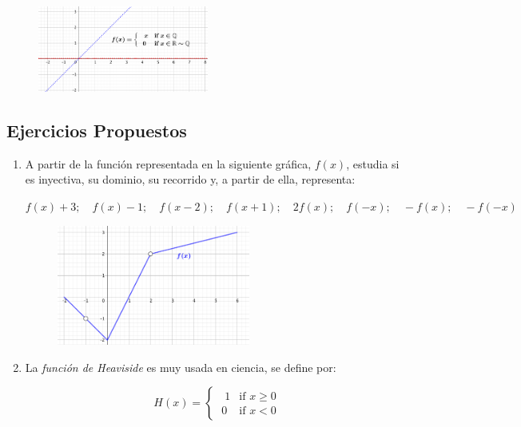{\begin{proofw}
			\begin{figure}[H]
			\centering
			\includegraphics[width=0.5\textwidth]{imagenes/imagenes02/T02IM23.png}
			\end{figure}
			
		\end{proofw}
		
		\subsection{Ejercicios Propuestos}	
		
		
		\begin{enumerate}[1).-  ]
		\item A partir de la función representada en la siguiente gráfica, $f(x)$, estudia si es inyectiva, su dominio, su recorrido y, a partir de ella, representa:
		
			$f(x)+3; \quad f(x)-1; \quad f(x-2); \quad f(x+1); \quad 2f(x); \quad f(-x); \quad -f(x); \quad -f(-x)$
		
			\begin{figure}[H]
			\centering
			\includegraphics[width=0.6\textwidth]{imagenes/imagenes02/T02IM22.png}	
			\end{figure}
		
		
		
		\item La \emph{función de Heaviside} es muy usada en ciencia, se define por:
		
			\begin{equation*}
			H(x)=
			\begin{cases} 
			\;\;  1 &\mbox{if } x \ge 0 \\ 
			\; 0 & \mbox{if } x<0 
			\end{cases}
			\end{equation*}
	

\end{enumerate}}
